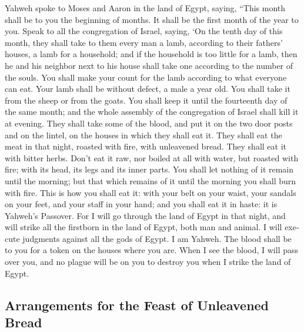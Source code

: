 \begin{paracol}{2}
\begin{otherlanguage}{english}
 Yahweh spoke to Moses and Aaron in the land of Egypt,
saying,  ``This month shall be to you the beginning of
months. It shall be the first month of the year to you. 
Speak to all the congregation of Israel, saying, `On the tenth day of
this month, they shall take to them every man a lamb, according to their
fathers' houses, a lamb for a household;  and if the
household is too little for a lamb, then he and his neighbor next to his
house shall take one according to the number of the souls. You shall
make your count for the lamb according to what everyone can eat.
 Your lamb shall be without defect, a male a year old. You
shall take it from the sheep or from the goats.  You shall
keep it until the fourteenth day of the same month; and the whole
assembly of the congregation of Israel shall kill it at evening.
 They shall take some of the blood, and put it on the two
door posts and on the lintel, on the houses in which they shall eat it.
 They shall eat the meat in that night, roasted with fire,
with unleavened bread. They shall eat it with bitter herbs.
 Don't eat it raw, nor boiled at all with water, but
roasted with fire; with its head, its legs and its inner parts.
 You shall let nothing of it remain until the morning;
but that which remains of it until the morning you shall burn with fire.
 This is how you shall eat it: with your belt on your
waist, your sandals on your feet, and your staff in your hand; and you
shall eat it in haste: it is Yahweh's Passover.  For I
will go through the land of Egypt in that night, and will strike all the
firstborn in the land of Egypt, both man and animal. I will execute
judgments against all the gods of Egypt. I am Yahweh. 
The blood shall be to you for a token on the houses where you are. When
I see the blood, I will pass over you, and no plague will be on you to
destroy you when I strike the land of Egypt.

\hypertarget{arrangements-for-the-feast-of-unleavened-bread}{%
\subsection{Arrangements for the Feast of Unleavened
Bread}\label{arrangements-for-the-feast-of-unleavened-bread}}


\end{otherlanguage}
\end{paracol}
